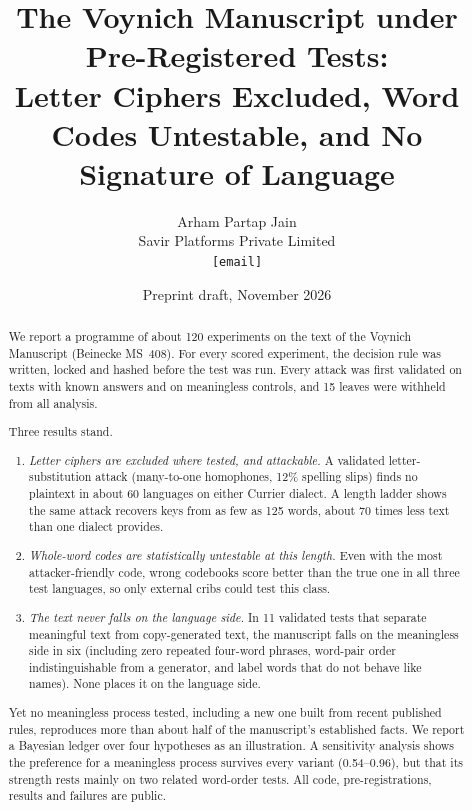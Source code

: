 \documentclass[11pt,a4paper]{article}
\title{The Voynich Manuscript under Pre-Registered Tests:\\
Letter Ciphers Excluded, Word Codes Untestable, and No Signature of Language}
\author{Arham Partap Jain\\ \small Savir Platforms Private Limited\\ \small \texttt{[email]}}
\date{Preprint draft, November 2026}
\begin{document}
\maketitle

\begin{abstract}
We report a programme of about 120 experiments on the text of the Voynich Manuscript (Beinecke MS~408). For every scored experiment, the decision rule was written, locked and hashed before the test was run. Every attack was first validated on texts with known answers and on meaningless controls, and 15 leaves were withheld from all analysis.

Three results stand.
\begin{enumerate}
\item \emph{Letter ciphers are excluded where tested, and attackable.} A validated letter-substitution attack (many-to-one homophones, 12\% spelling slips) finds no plaintext in about 60 languages on either Currier dialect. A length ladder shows the same attack recovers keys from as few as 125 words, about 70 times less text than one dialect provides.
\item \emph{Whole-word codes are statistically untestable at this length.} Even with the most attacker-friendly code, wrong codebooks score better than the true one in all three test languages, so only external cribs could test this class.
\item \emph{The text never falls on the language side.} In 11 validated tests that separate meaningful text from copy-generated text, the manuscript falls on the meaningless side in six (including zero repeated four-word phrases, word-pair order indistinguishable from a generator, and label words that do not behave like names). None places it on the language side.
\end{enumerate}

Yet no meaningless process tested, including a new one built from recent published rules, reproduces more than about half of the manuscript's established facts. We report a Bayesian ledger over four hypotheses as an illustration. A sensitivity analysis shows the preference for a meaningless process survives every variant (0.54--0.96), but that its strength rests mainly on two related word-order tests. All code, pre-registrations, results and failures are public.
\end{abstract}
\end{document}
